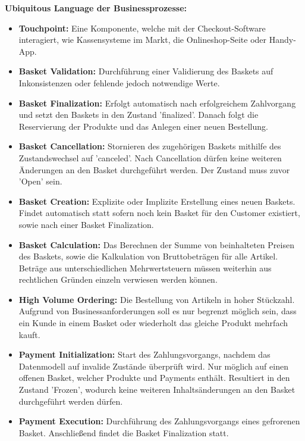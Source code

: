 \vspace{2em}

{\large \textbf{Ubiquitous Language der Businessprozesse:}}
\begin{itemize}[topsep=-3px]
	\item \textbf{Touchpoint: } { Eine Komponente, welche mit der Checkout-Software interagiert, wie Kassensysteme im Markt, die Onlineshop-Seite oder Handy-App.}
	\item \textbf{Basket Validation: } {Durchführung einer Validierung des Baskets auf Inkonsistenzen oder fehlende jedoch notwendige Werte.}
	\item \textbf{Basket Finalization: } {Erfolgt automatisch nach erfolgreichem Zahlvorgang und setzt den Baskets in den Zustand 'finalized'. Danach folgt die Reservierung der Produkte und das Anlegen einer neuen Bestellung.}
	\item \textbf{Basket Cancellation: } {Stornieren des zugehörigen Baskets mithilfe des Zustandswechsel auf 'canceled'. Nach Cancellation dürfen keine weiteren Änderungen an den Basket durchgeführt werden. Der Zustand muss zuvor 'Open' sein. }
	\item \textbf{Basket Creation: } {Explizite oder Implizite Erstellung eines neuen Baskets. Findet automatisch statt sofern noch kein Basket für den Customer existiert, sowie nach einer Basket Finalization.}
	\item \textbf{Basket Calculation: } {Das Berechnen der Summe von beinhalteten Preisen des Baskets, sowie die Kalkulation von Bruttobeträgen für alle Artikel. Beträge aus unterschiedlichen Mehrwertsteuern müssen weiterhin aus rechtlichen Gründen einzeln verwiesen werden können.}
	\item \textbf{High Volume Ordering: } {Die Bestellung von Artikeln in hoher Stückzahl. Aufgrund von Businessanforderungen soll es nur begrenzt möglich sein, dass ein Kunde in einem Basket oder wiederholt das gleiche Produkt mehrfach kauft.}
	\item \textbf{Payment Initialization: } {Start des Zahlungsvorgangs, nachdem das Datenmodell auf invalide Zustände überprüft wird. Nur möglich auf einen offenen Basket, welcher Produkte und Payments enthält. Resultiert in den Zustand 'Frozen', wodurch keine weiteren Inhaltsänderungen an den Basket durchgeführt werden dürfen.}
	\item \textbf{Payment Execution: } {Durchführung des Zahlungsvorgangs eines gefrorenen Basket. Anschließend findet die Basket Finalization statt.}
\end{itemize}
\vspace{2em}

